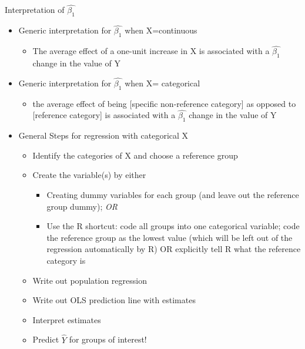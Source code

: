 \documentclass[
  8pt,
  ignorenonframetext,
  dvipsnames]{beamer}
\providecommand{\tightlist}{%
  \setlength{\itemsep}{0pt}\setlength{\parskip}{0pt}}
\let\olditem\item
\renewcommand{\item}{%
  \olditem\vspace{4pt}
}
\begin{document}
\begin{frame}{Interpretation of \(\hat{\beta_1}\)}
\protect\hypertarget{interpretation-of-hatbeta_1}{}

\begin{itemize}
\tightlist
\item
  Generic interpretation for \(\hat{\beta_1}\) when X=continuous

  \begin{itemize}
  \tightlist
  \item
    The average effect of a one-unit increase in X is associated with a
    \(\hat{\beta_1}\) change in the value of Y
  \end{itemize}
\item
  Generic interpretation for \(\hat{\beta_1}\) when X= categorical

  \begin{itemize}
  \tightlist
  \item
    the average effect of being {[}specific non-reference category{]} as
    opposed to {[}reference category{]} is associated with a
    \(\hat{\beta_1}\) change in the value of Y
  \end{itemize}
\end{itemize}

\medskip

\begin{itemize}
\tightlist
\item
  General Steps for regression with categorical X

  \begin{itemize}
  \tightlist
  \item
    Identify the categories of X and choose a reference group
  \item
    Create the variable(s) by either

    \begin{itemize}
    \tightlist
    \item
      Creating dummy variables for each group (and leave out the
      reference group dummy); \emph{OR}
    \item
      Use the R shortcut: code all groups into one categorical variable;
      code the reference group as the lowest value (which will be left
      out of the regression automatically by R) OR explicitly tell R
      what the reference category is
    \end{itemize}
  \item
    Write out population regression
  \item
    Write out OLS prediction line with estimates
  \item
    Interpret estimates
  \item
    Predict \(\hat{Y}\) for groups of interest!
  \end{itemize}
\end{itemize}

\end{frame}
\end{document}

